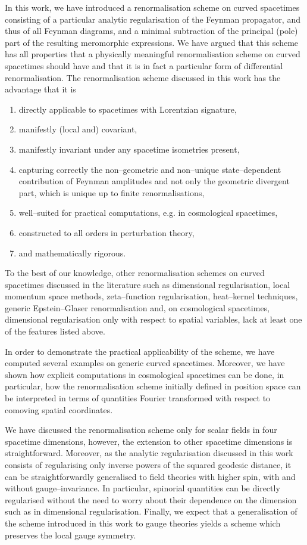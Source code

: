 \documentclass[a4paper,10pt,twoside]{article}
\numberwithin{equation}{section}
\newcounter{and}
\theoremstyle{plain}
\theoremstyle{definition}
\begin{document}
In this work, we have introduced a renormalisation scheme on curved spacetimes consisting of a particular analytic regularisation of the Feynman propagator, and thus of all Feynman diagrams, and a minimal subtraction of the principal (pole) part of the resulting meromorphic expressions. We have argued that this scheme has all properties that a physically meaningful renormalisation scheme on curved spacetimes should have and that it is in fact a particular form of differential renormalisation. The renormalisation scheme discussed in this work has the advantage that it is 
\begin{enumerate}
\item directly applicable to spacetimes with Lorentzian signature, 
\item manifestly (local and) covariant, 
\item manifestly invariant under any spacetime isometries present,
\item capturing correctly the non--geometric and non--unique state--dependent contribution of Feynman amplitudes and not only the geometric divergent part, which is unique up to finite renormalisations,
\item well--suited for practical computations, e.g. in cosmological spacetimes,
\item constructed to all orders in perturbation theory,
\item and mathematically rigorous.
\end{enumerate}
To the best of our knowledge, other renormalisation schemes on curved spacetimes discussed in the literature such as dimensional regularisation, local momentum space methods, zeta--function regularisation, heat--kernel techniques, generic Epstein--Glaser renormalisation and, on cosmological spacetimes, dimensional regularisation only with respect to spatial variables, lack at least one of the features listed above.

In order to demonstrate the practical applicability of the scheme, we have computed several examples on generic curved spacetimes. Moreover, we have shown how explicit computations in cosmological spacetimes can be done, in particular, how the renormalisation scheme initially defined in position space can be interpreted in terms of quantities Fourier transformed with respect to comoving spatial coordinates.

We have discussed the renormalisation scheme only for scalar fields in four spacetime dimensions, however, the extension to other spacetime dimensions is straightforward. Moreover, as the analytic regularisation discussed in this work consists of regularising only inverse powers of the squared geodesic distance, it can be straightforwardly generalised to field theories with higher spin, with and without gauge--invariance. In particular, spinorial quantities can be directly regularised without the need to worry about their dependence on the dimension such as in dimensional regularisation. Finally, we expect that a generalisation of the scheme introduced in this work to gauge theories yields a scheme which preserves the local gauge symmetry.
\end{document}
